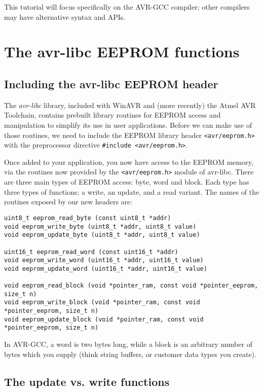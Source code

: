 \documentclass[a4paper,oneside,notitlepage]{book}
\begin{document}
This tutorial will focus specifically on the AVR-GCC compiler; other compilers may have alternative syntax and APIs.


\chapter{The avr-libc EEPROM functions}

\section{Including the avr-libc EEPROM header}

The \textit{avr-libc} library, included with WinAVR and (more recently) the Atmel AVR Toolchain, contains prebuilt library routines for EEPROM access and manipulation to simplify its use in user applications. Before we can make use of those routines, we need to include the EEPROM library header \lstinline{<avr/eeprom.h>} with the preprocessor directive \lstinline{#include <avr/eeprom.h>}.

Once added to your application, you now have access to the EEPROM memory, via the routines now provided by the \lstinline{<avr/eeprom.h>} module of avr-libc. There are three main types of EEPROM access: byte, word and block. Each type has three types of functions; a write, an update, and a read variant. The names of the routines exposed by our new headers are:

\begin{center}
\begin{lstlisting}
uint8_t eeprom_read_byte (const uint8_t *addr)
void eeprom_write_byte (uint8_t *addr, uint8_t value)
void eeprom_update_byte (uint8_t *addr, uint8_t value)

uint16_t eeprom_read_word (const uint16_t *addr)
void eeprom_write_word (uint16_t *addr, uint16_t value)
void eeprom_update_word (uint16_t *addr, uint16_t value)

void eeprom_read_block (void *pointer_ram, const void *pointer_eeprom, size_t n)
void eeprom_write_block (void *pointer_ram, const void *pointer_eeprom, size_t n)
void eeprom_update_block (void *pointer_ram, const void *pointer_eeprom, size_t n)
\end{lstlisting}
\end{center}

In AVR-GCC, a word is two bytes long, while a block is an arbitrary number of bytes which you supply (think string buffers, or customer data types you create).

\section{The update vs. write functions}
\end{document}
